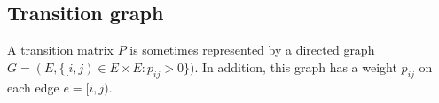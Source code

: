 \documentclass[a4paper,10pt,english]{article}
\begin{document}
\subsection{Transition graph}
A transition matrix $P$ is sometimes represented by a directed graph $G = (E, \{[i,j) \in E \times E: p_{ij} > 0\})$. 
In addition, this graph has a weight $p_{ij}$ on each edge $e = [i,j)$. 




\end{document}
